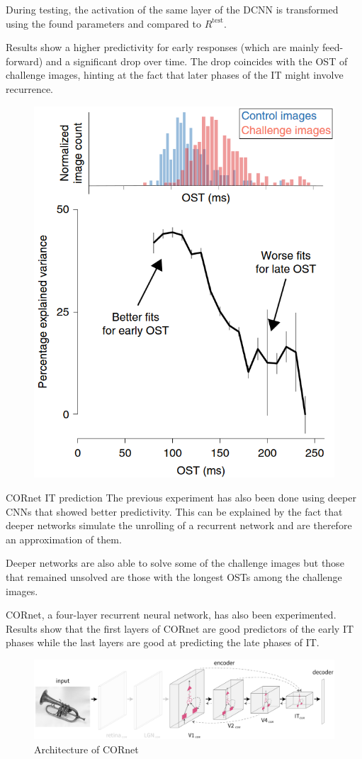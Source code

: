 \begin{casestudy}
\begin{descriptionlist}
            During testing, the activation of the same layer of the DCNN is transformed using the found parameters and compared to $R^\text{test}$.

            Results show a higher predictivity for early responses (which are mainly feed-forward) and a significant drop over time.
            The drop coincides with the OST of challenge images, hinting at the fact that later phases of the IT might involve recurrence.
            \begin{figure}[H]
                \centering
                \includegraphics[width=0.35\linewidth]{./img/recognition_reaction4.png}
            \end{figure}

        \item[CORnet IT prediction]
            The previous experiment has also been done using deeper CNNs that showed better predictivity.
            This can be explained by the fact that deeper networks simulate the unrolling of a recurrent network and are therefore an approximation of them.

            Deeper networks are also able to solve some of the challenge images but those that remained unsolved
            are those with the longest OSTs among the challenge images.

            CORnet, a four-layer recurrent neural network, has also been experimented.
            Results show that the first layers of CORnet are good predictors of the early IT phases while the last layers are good at predicting the late phases of IT.

            \begin{figure}[H]
                \centering
                \includegraphics[width=0.7\linewidth]{./img/cornet.png}
                \caption{Architecture of CORnet}
            \end{figure}


\end{descriptionlist}
\end{casestudy}
